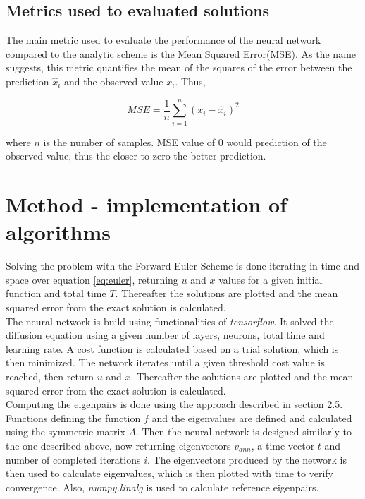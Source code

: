 \documentclass[a4paper,11pt,twocolumn]{article}
\begin{document}
\subsection{Metrics used to evaluated solutions}

The main metric used to evaluate the performance of the neural network compared to the analytic scheme is the Mean Squared Error(MSE). As the name suggests, this metric quantifies the mean of the squares of the error between the prediction $\hat{x}_i$ and the observed value $x_i$. Thus, 

\begin{equation*}
MSE = \frac{1}{n}\sum_{i=1}^n (x_i - \hat{x}_i)^2
\end{equation*}

where $n$ is the number of samples. MSE value of 0 would prediction of the observed value, thus the closer to zero the better prediction.  
 

\section{Method - implementation of algorithms}
Solving the problem with the Forward Euler Scheme is done iterating in time and space over equation \eqref{eq:euler}, returning $u$ and $x$ values for a given initial function and total time $T$. Thereafter the solutions are plotted and the mean squared error from the exact solution is calculated. 
\\
The neural network is build using functionalities of \textit{tensorflow}. It solved the diffusion equation using a given number of layers, neurons, total time and learning rate. A cost function is calculated based on a trial solution, which is then minimized. The network iterates until a given threshold cost value is reached, then return $u$ and $x$. Thereafter the solutions are plotted and the mean squared error from the exact solution is calculated.  
\\
Computing the eigenpairs is done using the approach described in section 2.5. Functions defining the function $f$ and the eigenvalues are defined and calculated using the symmetric matrix $A$. Then the neural network is designed similarly to the one described above, now returning eigenvectors $v_{dnn}$, a time vector $t$ and number of completed iterations $i$. The eigenvectors produced by the network is then used to calculate eigenvalues, which is then plotted with time to verify convergence. Also, \textit{numpy.linalg} is used to calculate reference eigenpairs. 
\end{document}
